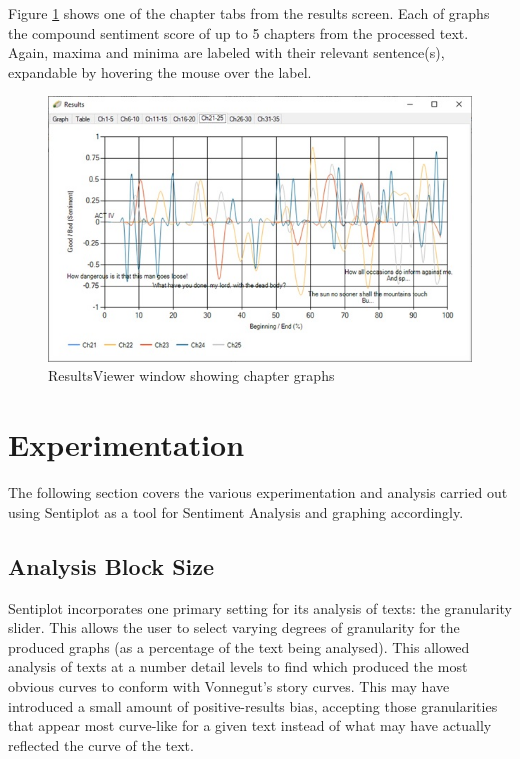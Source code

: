 \documentclass[a4paper]{article}
\begin{document}
        Figure \ref{fig:resultschapters} shows one of the chapter tabs from the results screen. Each of graphs the compound sentiment score of up to 5 chapters from the processed text. Again, maxima and minima are labeled with their relevant sentence(s), expandable by hovering the mouse over the label.
        \begin{figure}[H]
            \includegraphics[width=1\textwidth]{Misc/resultschapters}
            \caption{ResultsViewer window showing chapter graphs}
            \label{fig:resultschapters}
        \end{figure}
\newpage
\section{Experimentation}
The following section covers the various experimentation and analysis carried out using Sentiplot as a tool for Sentiment Analysis and graphing accordingly.
    \subsection{Analysis Block Size}
        Sentiplot incorporates one primary setting for its analysis of texts: the granularity slider. This allows the user to select varying degrees of granularity for the produced graphs (as a percentage of the text being analysed). This allowed analysis of texts at a number detail levels to find which produced the most obvious curves to conform with Vonnegut's story curves. This may have introduced a small amount of positive-results bias, accepting those granularities that appear most curve-like for a given text instead of what may have actually reflected the curve of the text.
\end{document}
